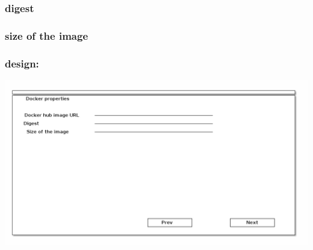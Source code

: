 \documentclass[11pt]{article}
\begin{document}
\subsubsection{digest}
\label{sec-3-0-2}
\subsubsection{size of the image}
\label{sec-3-0-3}
\subsubsection{design:}
\label{sec-3-0-4}
\includegraphics[width=.9\linewidth]{docker.png}
\end{document}
